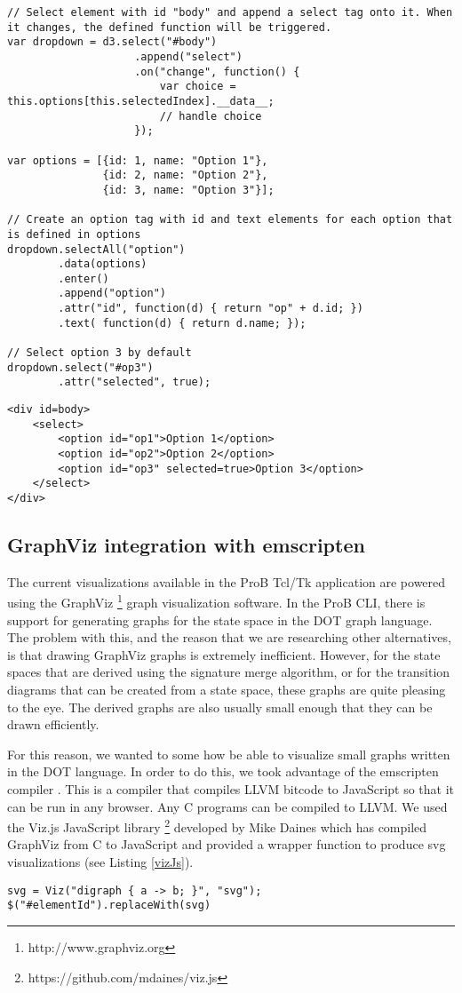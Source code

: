 \lstset{language=Java}
\begin{lstlisting}[caption=Dynamically create a dropdown menu.,label=d3Example]
// Select element with id "body" and append a select tag onto it. When it changes, the defined function will be triggered.
var dropdown = d3.select("#body")
				   	.append("select")
				   	.on("change", function() {
				   		var choice = this.options[this.selectedIndex].__data__;
				   		// handle choice
				   	});

var options = [{id: 1, name: "Option 1"},
			   {id: 2, name: "Option 2"},
			   {id: 3, name: "Option 3"}];

// Create an option tag with id and text elements for each option that is defined in options
dropdown.selectAll("option")
		.data(options)
		.enter()
		.append("option")
		.attr("id", function(d) { return "op" + d.id; })
		.text( function(d) { return d.name; });

// Select option 3 by default
dropdown.select("#op3")
		.attr("selected", true);
\end{lstlisting} 

\lstset{language=HTML}
\begin{lstlisting}[caption=Html generated from Listing \ref{d3Example},label=d3Result]
<div id=body>
    <select>
        <option id="op1">Option 1</option>
        <option id="op2">Option 2</option>
        <option id="op3" selected=true>Option 3</option>
    </select>
</div>
\end{lstlisting}


\subsection{GraphViz integration with emscripten}

The current visualizations available in the ProB Tcl/Tk application are powered using the GraphViz \footnote{http://www.graphviz.org} graph visualization software. In the ProB CLI, there is support for generating graphs for the state space in the DOT graph language. The problem with this, and the reason that we are researching other alternatives, is that drawing GraphViz graphs is extremely inefficient. However, for the state spaces that are derived using the signature merge algorithm, or for the transition diagrams that can be created from a state space, these graphs are quite pleasing to the eye. The derived graphs are also usually small enough that they can be drawn efficiently.

For this reason, we wanted to some how be able to visualize small graphs written in the DOT language. In order to do this, we took advantage of the emscripten compiler \cite{emscripten}. This is a compiler that compiles LLVM bitcode to JavaScript so that it can be run in any browser. Any C programs can be compiled to LLVM. We used the Viz.js JavaScript library \footnote{https://github.com/mdaines/viz.js} developed by Mike Daines which has compiled GraphViz from C to JavaScript and provided a wrapper function to produce svg visualizations (see Listing \ref{vizJs}).

\begin{lstlisting}[caption=Create a visualization with viz.js and insert it into an html page.,label=vizJs]
svg = Viz("digraph { a -> b; }", "svg");
$("#elementId").replaceWith(svg)
\end{lstlisting}